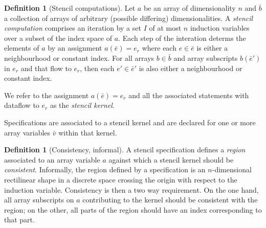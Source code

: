 \documentclass[10pt,preprint]{sigplanconf}
\newcommand{\dnote}[1]{\textcolor{darkpurple}{Dom: #1}}
\newcounter{block}
\theoremstyle{definition}
\newtheorem{definition}[block]{Definition}
\begin{document}
\begin{definition}[Stencil computations]
  Let $a$ be an array of dimensionality $n$ and $\overline{b}$ a
  collection of arrays of arbitrary (possible differing)
  dimensionalities.
  A \emph{stencil computation} comprises an iteration by a set $I$ of at
  most $n$ induction variables
  over a subset of the index space of $a$. Each step of the interation
  determs the elements of $a$ by an
  assignment $a(\bar{e}) = e_r$ where each $e \in
  \bar{e}$ is either a neighbourhood or constant index.
  For all arrays $b \in \bar{b}$ and array subscripts $b(\bar{e}')$ in
  $e_r$ and that flow to $e_r$, then each $e' \in \bar{e}'$ is also
  either a neighbourhood or constant index.

  We refer to the assignment $a(\bar{e}) = e_r$ and all the associated
  statements with dataflow to $e_r$ as the \emph{stencil kernel}.
\label{def:stencil}
\end{definition}

\noindent
Specifications are associated to a stencil kernel
and are declared for one or more array variables
$\bar{v}$ within that kernel.


\marginpar{\dnote{Is it worth having this informal consistency here?}}
\begin{definition}[Consistency, informal]
  A stencil specification defines a \emph{region} associated to an
  array variable $a$ against which a stencil kernel should be
  \emph{consistent}. Informally, the region defined by a specification
  is an $n$-dimensional rectilinear shape in a discrete space crossing the origin with respect to the induction
  variable. Consistency is then a two way requirement.
  On the one hand, all array subscripts on $a$ contributing to the kernel
  should be consistent with the region; on the other, all parts of the
  region should have an index corresponding to that part.
\end{definition}
\end{document}
